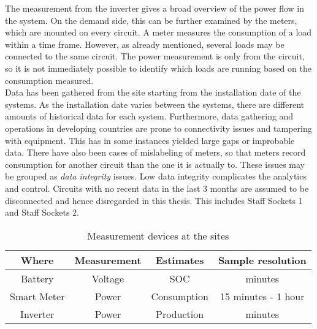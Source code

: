 The measurement from the inverter gives a broad overview of the power flow in the system. On the demand side, this can be further examined by the meters, which are mounted on every circuit. A meter measures the consumption of a load within a time frame. However, as already mentioned, several loads may be connected to the same circuit. The power measurement is only from the circuit, so it is not immediately possible to identify which loads are running based on the consumption measured.\\

Data has been gathered from the site starting from the installation date of the systems. As the installation date varies between the systems, there are different amounts of historical data for each system. Furthermore, data gathering and operations in developing countries are prone to connectivity issues and tampering with equipment. This has in some instances yielded large gaps or improbable data. There have also been cases of mislabeling of meters, so that meters record consumption for another circuit than the one it is actually to. These issues may be grouped as \textit{data integrity} issues. Low data integrity complicates the analytics and control. Circuits with no recent data in the last 3 months are assumed to be disconnected and hence disregarded in this thesis. This includes Staff Sockets 1 and Staff Sockets 2. 


\begin{table}[h]
    \centering
    \begin{tabular}{c|c|c|c}
        \textbf{Where} & \textbf{Measurement} & \textbf{Estimates} & \textbf{Sample resolution}\\
        \hline
         Battery & Voltage & SOC & minutes\\ 
         \hline
         Smart Meter & Power & Consumption & 15 minutes - 1 hour\\
         \hline 
         Inverter & Power & Production & minutes
    \end{tabular}
    \caption[Measurement devices]{Measurement devices at the sites}
    \label{tab:measurement_devices}
\end{table}


